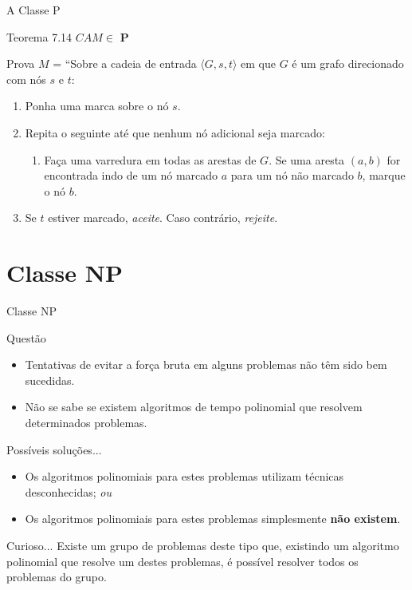 \documentclass[xcolor=dvipsnames,table]{beamer}
\begin{document}
	\begin{frame}{A Classe P}
		\begin{block}{Teorema 7.14}
			$CAM \in$ {\bf P}
		\end{block} 
		\begin{block}{Prova}
			$M$ = ``Sobre a cadeia de entrada $\langle G, s, t \rangle$ em que $G$ é um grafo direcionado com nós $s$ e $t$:
			\begin{enumerate}
				\item Ponha uma marca sobre o nó $s$.
				\item Repita o seguinte até que nenhum nó adicional seja marcado:
				\begin{enumerate}
					\item Faça uma varredura em todas as arestas de $G$. Se uma aresta $(a,b)$ for encontrada indo de um nó marcado $a$ para um nó não marcado $b$, marque o nó $b$.
				\end{enumerate}
				\item Se $t$ estiver marcado, {\it aceite}. Caso contrário, {\it rejeite}.
			\end{enumerate}
		\end{block}
	\end{frame}

	\section{Classe NP}		
	\begin{frame}[shrink]{Classe NP}
		\begin{block}{Questão}
			\begin{itemize}
				\item Tentativas de evitar a força bruta em alguns problemas não têm sido bem sucedidas. \pause
				\item Não se sabe se existem algoritmos de tempo polinomial que resolvem determinados problemas.
			\end{itemize}
		\end{block} \pause
		\begin{block}{Possíveis soluções...}
			\begin{itemize}
				\item Os algoritmos polinomiais para estes problemas utilizam técnicas desconhecidas; {\it ou} \pause
				\item Os algoritmos polinomiais para estes problemas simplesmente {\bf não existem}.
			\end{itemize}
		\end{block} \pause
		\begin{exampleblock}{Curioso...}
			Existe um grupo de problemas deste tipo que, existindo um algoritmo polinomial que resolve um destes problemas, é possível resolver todos os problemas do grupo.
		\end{exampleblock}
	\end{frame}					
	
\end{document}

